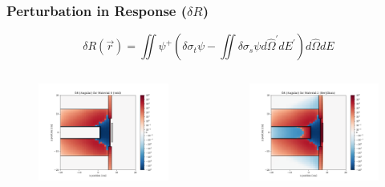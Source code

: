 \documentclass[t]{beamer}
\begin{document}
\begin{frame}
  \frametitle{Perturbation in Response ($\delta R$)}
  \vskip-0.25in
  \begin{equation}
    \delta R\left(\vec{r}\right) = \iint\psi^+\left(\delta\sigma_t\psi - \iint\delta\sigma_s\psi d\hat{\Omega}^\prime dE^\prime\right)d\hat{\Omega}dE
  \end{equation}
  \vskip-0.25in
  \begin{columns}
    \begin{figure}
      \includegraphics[trim={0.7in 0.15in 1.05in 0.4in},clip,scale=0.36]{images/dR_angular_00.png}
    \end{figure}
    \begin{figure}
      \includegraphics[trim={0.7in 0.15in 1.05in 0.4in},clip,scale=0.36]{images/dR_angular_02.png}

\end{figure}
\end{columns}
\end{frame}
\end{document}
